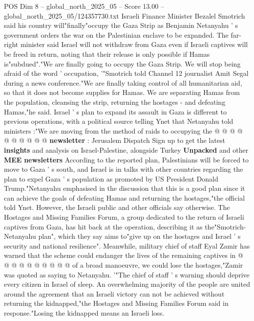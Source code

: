\begin{textsample}{POS Dim 8 – global\_north\_2025\_05 – Score 13.00 – global\_north\_2025\_05/124357730.txt}  \label{ex:f8_pos_037}
Israeli Finance Minister Bezalel Smotrich said his country will"finally"occupy the Gaza Strip as Benjamin Netanyahu ' s government orders the war on the Palestinian enclave to be expanded.
The far-right minister said Israel will not withdraw from Gaza even if Israeli captives will be freed in return, noting that their release is only possible if Hamas is"subdued"."We are finally going to occupy the Gaza Strip.
We will stop being afraid of the word ' occupation, '"Smotrich told Channel 12 journalist Amit Segal during a news conference."We are finally taking control of all humanitarian aid, so that it does not become supplies for Hamas.
We are separating Hamas from the population, cleansing the strip, returning the hostages - and defeating Hamas,"he said.
Israel ' s plan to expand its assault in Gaza is different to previous operations, with a political source telling Ynet that Netanyahu told ministers :"We are moving from the method of raids to occupying the @ @ @ @ @ @ @ @ @ @ \textbf{newsletter} : Jerusalem Dispatch Sign up to get the latest \textbf{insights} and analysis on Israel-Palestine, alongside Turkey \textbf{Unpacked} and other \textbf{MEE} \textbf{newsletters} According to the reported plan, Palestinians will be forced to move to Gaza ' s south, and Israel is in talks with other countries regarding the plan to expel Gaza ' s population as promoted by US President Donald Trump."Netanyahu emphasised in the discussion that this is a good plan since it can achieve the goals of defeating Hamas and returning the hostages,"the official told Ynet.
However, the Israeli public and other officials say otherwise.
The Hostages and Missing Families Forum, a group dedicated to the return of Israeli captives from Gaza, has hit back at the operation, describing it as the"Smotrich-Netanyahu plan", which they say aims to"give up on the hostages and Israel ' s security and national resilience".
Meanwhile, military chief of staff Eyal Zamir has warned that the scheme could endanger the lives of the remaining captives in @ @ @ @ @ @ @ @ @ @ of a broad manoeuvre, we could lose the hostages,"Zamir was quoted as saying to Netanyahu. '"The chief of staff ' s warning should deprive every citizen in Israel of sleep.
An overwhelming majority of the people are united around the agreement that an Israeli victory can not be achieved without returning the kidnapped,"the Hostages and Missing Families Forum said in response."Losing the kidnapped means an Israeli loss.

\end{textsample}
